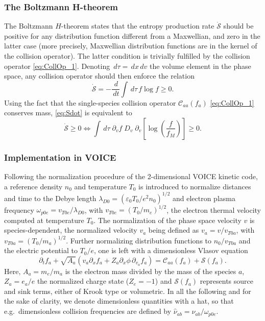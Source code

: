 \documentclass[11pt]{article}
\begin{document}
\subsubsection{The Boltzmann H-theorem}
The Boltzmann $H$-theorem states that the entropy production rate $\dot{\mathcal{S}}$ should be positive for any distribution function different from a Maxwellian, and zero in the latter case (more precisely, Maxwellian distribution functions are in the kernel of the collision operator). The latter condition is trivially fulfilled by the collision operator \cref{eq:CollOp_1}. Denoting $\,d\tau = \,d x\,d v$ the volume element in the phase space, any collision operator should then enforce the relation 
%
\begin{equation} \label{eq:Sdot}
\dot{\mathcal{S}} = - \frac{\,d}{\,d t} \int \,d\tau \, f\log f \geq 0.
\end{equation}
%
Using the fact that the single-species collision operator $\mathcal{C}_{aa}(f_a)$ \cref{eq:CollOp_1} conserves mass, \cref{eq:Sdot} is equivalent to
%
\begin{equation} \label{eq:Sdot2}
\dot{\mathcal{S}} \geq 0 \Leftrightarrow 
\int\,d\tau \; \partial_v f \; D_v \; \partial_v\left[ \log\left(\frac{f}{f_M}\right) \right] \geq 0.
\end{equation}
%

\subsubsection{Implementation in VOICE}
Following the normalization procedure of the 2-dimensional \textsc{VOICE} kinetic code, a reference density $n_0$ and temperature $T_0$ is introduced to normalize distances and time to the Debye length $\lambda_{D0} = (\varepsilon_0T_0/e^2n_0)^{1/2}$ and electron plasma frequency $\omega_{p0e} = v_{T0e} / \lambda_{D0}$, with $v_{T0e} = (T_0/m_e)^{1/2}$, the electron thermal velocity computed at temperature $T_0$. The normalization of the phase space velocity $v$ is species-dependent, the normalized velocity $v_a$ being defined as $v_a = v/v_{T0a}$, with $v_{T0a} = (T_0/m_a)^{1/2}$. Further normalizing distribution functions to $n_0/v_{T0a}$ and the electric potential to $T_0/e$, one is left with a dimensionless Vlasov equation
%
\begin{equation}
	 \partial_t f_a 
	 + \sqrt{A_a}\left(v_a\partial_x f_a + Z_a \partial_x\phi\, \partial_{v_a}f_a \right)
	 = \mathcal{C}_{aa}(f_a) + \mathcal{S}(f_a).
\end{equation}
%
Here, $A_a=m_e/m_a$ is the electron mass divided by the mass of the species $a$, $Z_a=e_a/e$ the normalized charge state ($Z_e=-1$) and $\mathcal{S}(f_a)$ represents source and sink terms, either of Krook type or volumetric. In all the following and for the sake of clarity, we denote dimensionless quantities with a hat, so that e.g.\ dimensionless collision frequencies are defined by $\hat\nu_{ab} = \nu_{ab} / \omega_{p0e}$.
\end{document}
